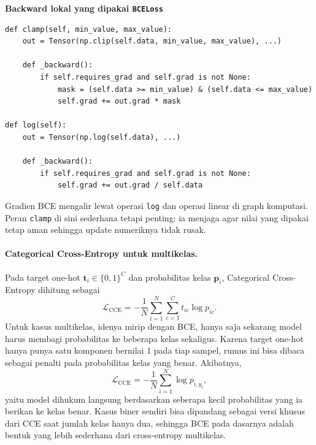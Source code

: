\documentclass{article}
\begin{document}
\noindent\textbf{Backward lokal yang dipakai \texttt{BCELoss}}\par
\begin{lstlisting}
def clamp(self, min_value, max_value):
    out = Tensor(np.clip(self.data, min_value, max_value), ...)

    def _backward():
        if self.requires_grad and self.grad is not None:
            mask = (self.data >= min_value) & (self.data <= max_value)
            self.grad += out.grad * mask

def log(self):
    out = Tensor(np.log(self.data), ...)

    def _backward():
        if self.requires_grad and self.grad is not None:
            self.grad += out.grad / self.data
\end{lstlisting}
Gradien BCE mengalir lewat operasi \texttt{log} dan operasi linear di graph komputasi. Peran \texttt{clamp} di sini sederhana tetapi penting: ia menjaga agar nilai yang dipakai tetap aman sehingga update numeriknya tidak rusak.

\paragraph{Categorical Cross-Entropy untuk multikelas.}
Pada target one-hot $\mathbf{t}_i\in\{0,1\}^C$ dan probabilitas kelas $\mathbf{p}_i$, Categorical Cross-Entropy dihitung sebagai
\begin{equation}
\mathcal{L}_{\mathrm{CCE}} = -\frac{1}{N}\sum_{i=1}^N\sum_{c=1}^C t_{ic}\log p_{ic}.
\end{equation}
Untuk kasus multikelas, idenya mirip dengan BCE, hanya saja sekarang model harus membagi probabilitas ke beberapa kelas sekaligus. Karena target one-hot hanya punya satu komponen bernilai 1 pada tiap sampel, rumus ini bisa dibaca sebagai penalti pada probabilitas kelas yang benar. Akibatnya,
\begin{equation}
\mathcal{L}_{\mathrm{CCE}}
=
-\frac{1}{N}\sum_{i=1}^{N}\log p_{i,y_i},
\end{equation}
yaitu model dihukum langsung berdasarkan seberapa kecil probabilitas yang ia berikan ke kelas benar. Kasus biner sendiri bisa dipandang sebagai versi khusus dari CCE saat jumlah kelas hanya dua, sehingga BCE pada dasarnya adalah bentuk yang lebih sederhana dari cross-entropy multikelas.
\end{document}
